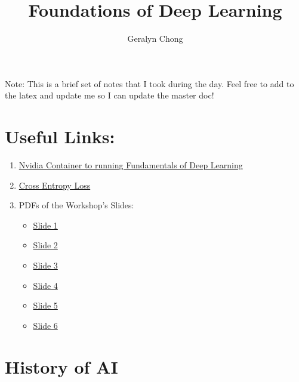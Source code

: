 \documentclass{article}
\title{Foundations of Deep Learning}
\author{Geralyn Chong}
\begin{document}
\maketitle
\tableofcontents

\vspace{10pt}
\begin{small}
Note: This is a brief set of notes that I took during the day. Feel free to add to the latex and update me so I can update the master doc!
\end{small}

\section{Useful Links:}
\begin{enumerate}
    \item \href{https://catalog.ngc.nvidia.com/orgs/nvidia/containers/dli-dl-fundamentals}{Nvidia Container to running Fundamentals of Deep Learning}
    \item \href{https://gombru.github.io/2018/05/23/cross_entropy_loss/}{Cross Entropy Loss}
    \item PDFs of the Workshop's Slides:
    \begin{itemize}
        \item \href{https://drive.google.com/file/d/1IJbwErD_sPRxy15AlihhnK6s7yEMlci_/view?usp=drive_link}{Slide 1}
        \item \href{https://drive.google.com/file/d/1wIJISrSTmXjoDfUpvk4yGvzBWxXGaXKL/view?usp=sharing}{Slide 2}
        \item \href{https://drive.google.com/file/d/1tT1qHztY3PxpvqJ6jeBhF67t4TYbMtiD/view?usp=drive_link}{Slide 3}
        \item \href{https://drive.google.com/file/d/1v2rKuM5UdxolFZd2iy8b36yGFi_0bmur/view?usp=sharing}{Slide 4}
        \item \href{https://drive.google.com/file/d/1HoWBOPXJSpdl1rIhvSN0EBnoO0VdJYEh/view?usp=drive_link}{Slide 5}
        \item \href{https://drive.google.com/file/d/1aK88wA-z32ZiDT_4isxbjv6FK_aXuM_V/view?usp=drive_link}{Slide 6}
    \end{itemize}
\end{enumerate}
\section{History of AI}
\end{document}
